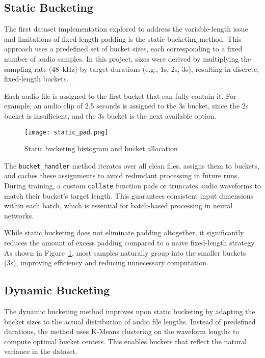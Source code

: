 \subsection{Static Bucketing}
\label{subsec:static_dataset}

The first dataset implementation explored to address the variable-length issue and limitations of fixed-length padding is the static bucketing method. This approach uses a predefined set of bucket sizes, each corresponding to a fixed number of audio samples. In this project, sizes were derived by multiplying the sampling rate (48~kHz) by target durations (e.g., 1s, 2s, 3s), resulting in discrete, fixed-length buckets.

Each audio file is assigned to the first bucket that can fully contain it. For example, an audio clip of 2.5 seconds is assigned to the 3s bucket, since the 2s bucket is insufficient, and the 3s bucket is the next available option.

\begin{figure}[H]
    \centering
    \texttt{[image: static\_pad.png]}
    \caption{Static bucketing histogram and bucket allocation}
    \label{fig:static_pad}
\end{figure}

The \texttt{bucket\_handler} method iterates over all clean files, assigns them to buckets, and caches these assignments to avoid redundant processing in future runs. During training, a custom \texttt{collate} function pads or truncates audio waveforms to match their bucket’s target length. This guarantees consistent input dimensions within each batch, which is essential for batch-based processing in neural networks.

While static bucketing does not eliminate padding altogether, it significantly reduces the amount of excess padding compared to a naive fixed-length strategy. As shown in Figure~\ref{fig:static_pad}, most samples naturally group into the smaller buckets (3s), improving efficiency and reducing unnecessary computation.

\subsection{Dynamic Bucketing}
\label{subsec:dynamic_dataset}

The dynamic bucketing method improves upon static bucketing by adapting the bucket sizes to the actual distribution of audio file lengths. Instead of predefined durations, the method uses K-Means clustering on the waveform lengths to compute optimal bucket centers. This enables buckets that reflect the natural variance in the dataset.

